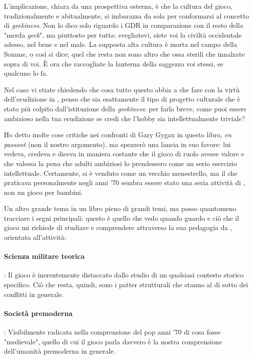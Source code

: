 L'implicazione, chiara da una prospettiva esterna, è che la cultura del gioco, tradizionalmente e abitualmente, si imbarazza da sola per conformarsi al concetto di \textit{geekiness}. Non lo dico solo riguardo i GDR in comparazione con il resto della "merda \textit{geek}", ma piuttosto per tutta: svegliatevi, siete voi la civiltà occidentale adesso, nel bene e nel male. La supposta alta cultura è morta nel campo della Somme, o così si dice; quel che resta non sono altro che ossa sterili che innalzate sopra di voi. È ora che raccogliate la lanterna della saggezza voi stessi, se qualcuno lo fa.

Nel caso vi stiate chiedendo che cosa tutto questo abbia a che fare con la virtù dell'erudizione in \dnd{}, penso che \dnd{} sia esattamente il tipo di progetto culturale che è stato più colpito dall'istituzione della \textit{geekiness}: per farla breve, come puoi essere ambizioso nella tua erudizione se credi che l'hobby sia intellettualmente triviale?

Ho detto molte cose critiche nei confronti di Gary Gygax in questo libro, \textit{en passant} (non il nostro argomento), ma spezzerò una lancia in suo favore: lui vedeva, credeva e diceva in maniera costante che il gioco di ruolo avesse valore e che valessa la pena che adulti ambiziosi lo prendessero come un serio esercizio intellettuale. Certamente, si è venduto come un vecchio menestrello, ma il \dnd{} che praticava personalmente negli anni '70 sembra essere stato una seria attività di , non un gioco per bambini.


Un altro grande tema in un libro pieno di grandi temi, ma posso quantomeno tracciare i segni principali: questo è quello che vedo quando guardo \dnd{} e ciò che il gioco mi richiede di studiare e comprendere attraverso la sua pedagogia da , orientata all'attività:

\paragraph{Scienza militare teorica}: Il gioco è inerentemente distaccato dallo studio di un qualsiasi contesto storico specifico. Ciò che resta, quindi, sono i patter strutturali che stanno al di sotto dei conflitti in generale.

\paragraph{Società premoderna}: Visibilmente radicata nella comprensione del pop anni '70 di cosa fosse "medievale", quello di cui il gioco parla davvero è la nostra comprensione dell'umanità premoderna in generale.

